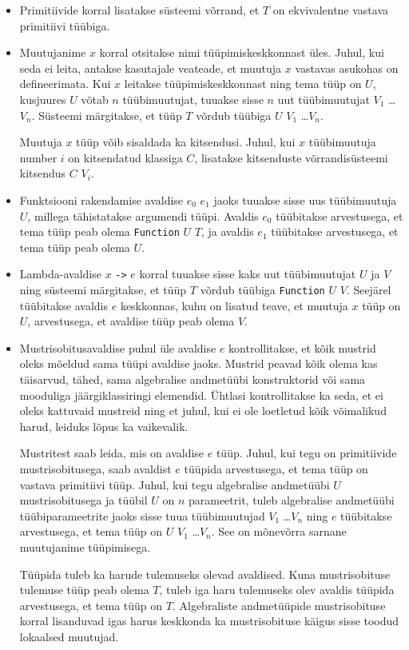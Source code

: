 \documentclass[12pt]{article}
\begin{document}
        \begin{itemize}
          \item
            Primitiivide korral lisatakse süsteemi võrrand, et $T$ on ekvivalentne vastava primitiivi tüübiga.
          \item
            Muutujanime $x$ korral otsitakse nimi tüüpimiskeskkonnast üles. Juhul, kui seda ei leita, antakse kasutajale veateade, et muutuja $x$ vastavas asukohas on defineerimata. Kui $x$ leitakse tüüpimiskeskkonnast ning tema tüüp on $U$, kusjuures $U$ võtab $n$ tüübimuutujat, tuuakse sisse $n$ uut tüübimuutujat $V_1$ \ldots $V_n$. Süsteemi märgitakse, et tüüp $T$ võrdub tüübiga $U$ $V_1$ \ldots $V_n$.

            Muutuja $x$ tüüp võib sisaldada ka kitsendusi. Juhul, kui $x$ tüübimuutuja number $i$ on kitsendatud klassiga $C$, lisatakse kitsenduste võrrandisüsteemi kitsendus $C$ $V_i$.
          \item
            Funktsiooni rakendamise avaldise $e_0$ $e_1$ jaoks tuuakse sisse uus tüübimuutuja $U$, millega tähistatakse argumendi tüüpi. Avaldis $e_0$ tüübitakse arvestusega, et tema tüüp peab olema \verb!Function! $U$ $T$, ja avaldis $e_1$ tüübitakse arvestusega, et tema tüüp peab olema $U$.
          \item
            Lambda-avaldise $x$ \verb!->! $e$ korral tuuakse sisse kaks uut tüübimuutujat $U$ ja $V$ ning süsteemi märgitakse, et tüüp $T$ võrdub tüübiga \verb!Function! $U$ $V$. Seejärel tüübitakse avaldis $e$ keskkonnas, kuhu on lisatud teave, et muutuja $x$ tüüp on $U$, arvestusega, et avaldise tüüp peab olema $V$.
          \item
            Mustrisobitusavaldise puhul üle avaldise $e$ kontrollitakse, et kõik mustrid oleks mõeldud sama tüüpi avaldise jaoks. Mustrid peavad kõik olema kas täisarvud, tähed, sama algebralise andmetüübi konstruktorid või sama mooduliga jäärgiklassiringi elemendid. Ühtlasi kontrollitakse ka seda, et ei oleks kattuvaid mustreid ning et juhul, kui ei ole loetletud kõik võimalikud harud, leiduks lõpus ka vaikevalik.

            Mustritest saab leida, mis on avaldise $e$ tüüp. Juhul, kui tegu on primitiivide mustrisobitusega, saab avaldist $e$ tüüpida arvestusega, et tema tüüp on vastava primitiivi tüüp. Juhul, kui tegu algebralise andmetüübi $U$ mustrisobitusega ja tüübil $U$ on $n$ parameetrit, tuleb algebralise andmetüübi tüübiparameetrite jaoks sisse tuua tüübimuutujad $V_1$ \ldots $V_n$ ning $e$ tüübitakse arvestusega, et tema tüüp on $U$ $V_1$ \ldots $V_n$. See on mõnevõrra sarnane muutujanime tüüpimisega.

            Tüüpida tuleb ka harude tulemuseks olevad avaldised. Kuna mustrisobituse tulemuse tüüp peab olema $T$, tuleb iga haru tulemuseks olev avaldis tüüpida arvestusega, et tema tüüp on $T$. Algebraliste andmetüüpide mustrisobituse korral lisanduvad igas harus keskkonda ka mustrisobituse käigus sisse toodud lokaalsed muutujad.
        \end{itemize}
\end{document}
